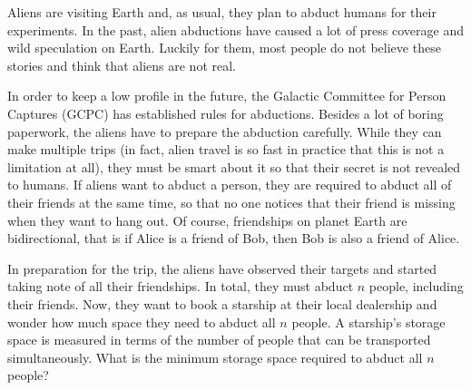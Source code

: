 



Aliens are visiting Earth and, as usual, they plan to abduct humans for their experiments.
In the past, alien abductions have caused a lot of press coverage and wild speculation on Earth.
Luckily for them, most people do not believe these stories and think that aliens are not real.

In order to keep a low profile in the future, the Galactic Committee for Person Captures (GCPC) has established rules for abductions.
Besides a lot of boring paperwork, the aliens have to prepare the abduction carefully.
While they can make multiple trips (in fact, alien travel is so fast in practice that this is not a limitation at all),
they must be smart about it so that their secret is not revealed to humans. If aliens want to abduct a person,
they are required to abduct all of their friends at the same time, so that no one notices that their friend is missing when they want to hang out.
Of course, friendships on planet Earth are bidirectional, that is if Alice is a friend of Bob, then Bob is also a friend of Alice.

In preparation for the trip, the aliens have observed their targets and started taking note of all their friendships.
In total, they must abduct $n$ people, including their friends.
Now, they want to book a starship at their local dealership and wonder how much space they need to abduct all $n$ people.
A starship's storage space is measured in terms of the number of people that can be transported simultaneously.
What is the minimum storage space required to abduct all $n$ people?

